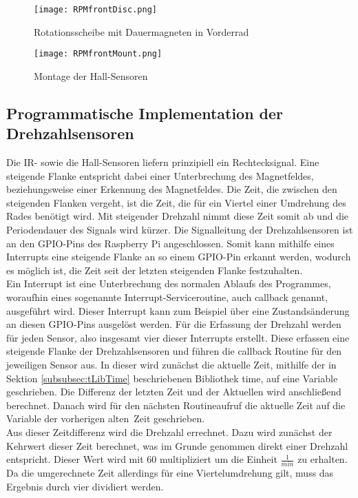 \begin{figure}[h]
\centering
\texttt{[image: RPMfrontDisc.png]}
\caption{Rotationsscheibe mit Dauermagneten in Vorderrad}
\label{fig:RPMfrontDisc}
\end{figure}

\begin{figure}[h]
\centering
\texttt{[image: RPMfrontMount.png]}
\caption{Montage der Hall-Sensoren}
\label{fig:RPMfrontMount}
\end{figure}

\subsection{Programmatische Implementation der Drehzahlsensoren}
\label{subsec:RPMprogram}
Die \ac{IR}- sowie die Hall-Sensoren liefern prinzipiell ein Rechtecksignal. Eine steigende Flanke entspricht dabei einer Unterbrechung des Magnetfeldes, beziehungsweise einer Erkennung des Magnetfeldes. Die Zeit, die zwischen den steigenden Flanken vergeht, ist  die Zeit, die für ein Viertel einer Umdrehung des Rades benötigt wird. Mit steigender Drehzahl nimmt diese Zeit somit ab und die Periodendauer des Signals wird kürzer. Die Signalleitung der Drehzahlsensoren ist an den \ac{GPIO}-Pins des Raspberry Pi angeschlossen. Somit kann mithilfe eines Interrupts eine steigende Flanke an so einem \ac{GPIO}-Pin erkannt werden, wodurch es möglich ist, die Zeit seit der letzten steigenden Flanke festzuhalten.\\
Ein Interrupt ist eine Unterbrechung des normalen Ablaufs des Programmes, woraufhin eines sogenannte Interrupt-Serviceroutine, auch callback genannt, ausgeführt wird. Dieser Interrupt kann zum Beispiel über eine Zustandsänderung an diesen \ac{GPIO}-Pins ausgelöst werden. Für die Erfassung der Drehzahl werden für jeden Sensor, also insgesamt vier dieser Interrupts erstellt. Diese erfassen eine steigende Flanke der Drehzahlsensoren und führen die callback Routine für den jeweiligen Sensor aus. In dieser wird zunächst die aktuelle Zeit, mithilfe der in Sektion \ref{subsubsec:tLibTime} beschriebenen Bibliothek time, auf eine Variable geschrieben. Die Differenz der letzten Zeit und der Aktuellen wird anschließend berechnet. Danach wird für den nächsten Routineaufruf die aktuelle Zeit auf die Variable der vorherigen \glqq alten\grqq\ Zeit geschrieben.\\
Aus dieser Zeitdifferenz wird die Drehzahl errechnet. Dazu wird zunächst der Kehrwert dieser Zeit berechnet, was im Grunde genommen direkt einer Drehzahl entspricht. Dieser Wert wird mit 60 multipliziert um die Einheit $\frac{1}{min}$ zu erhalten. Da die umgerechnete Zeit allerdings für eine Viertelumdrehung gilt, muss das Ergebnis durch vier dividiert werden.
